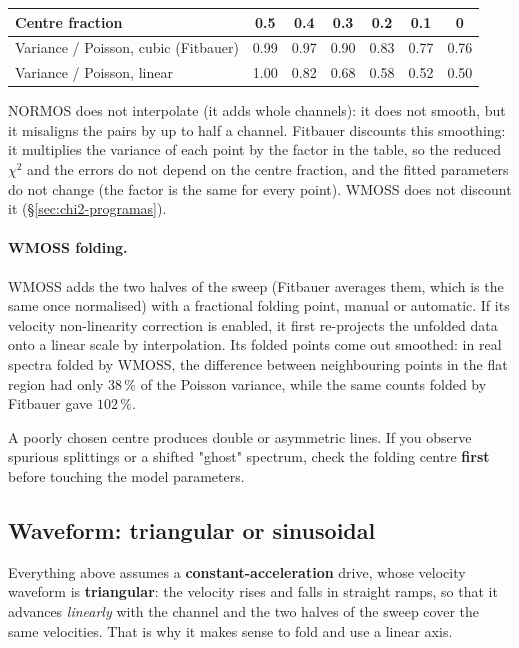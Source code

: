 \begin{center}
\begin{tabular}{@{}lcccccc@{}}
\toprule
Centre fraction & 0.5 & 0.4 & 0.3 & 0.2 & 0.1 & 0 \\
\midrule
Variance / Poisson, cubic (Fitbauer) & 0.99 & 0.97 & 0.90 & 0.83 & 0.77 & 0.76 \\
Variance / Poisson, linear           & 1.00 & 0.82 & 0.68 & 0.58 & 0.52 & 0.50 \\
\bottomrule
\end{tabular}
\end{center}

\noindent NORMOS does not interpolate (it adds whole channels): it does not
smooth, but it misaligns the pairs by up to half a channel. Fitbauer discounts this smoothing: it multiplies the variance of each point by
the factor in the table, so the reduced $\chi^2$ and the errors do not depend on
the centre fraction, and the fitted parameters do not change (the factor is the
same for every point). WMOSS does not discount it (§\ref{sec:chi2-programas}).

\paragraph{WMOSS folding.} WMOSS adds the two halves of the sweep (Fitbauer
averages them, which is the same once normalised) with a fractional folding
point, manual or automatic. If its velocity non-linearity correction is enabled,
it first re-projects the unfolded data onto a linear scale by interpolation. Its
folded points come out smoothed: in real spectra folded by WMOSS, the difference
between neighbouring points in the flat region had only $38\,\%$ of the Poisson
variance, while the same counts folded by Fitbauer gave $102\,\%$.

\begin{aviso}
A poorly chosen centre produces double or asymmetric lines. If you observe
spurious splittings or a shifted "ghost" spectrum, check the folding centre
\textbf{first} before touching the model parameters.
\end{aviso}

\subsection{Waveform: triangular or sinusoidal}
\label{sec:drive-form}

Everything above assumes a \textbf{constant-acceleration} drive, whose velocity
waveform is \textbf{triangular}: the velocity rises and falls in straight ramps,
so that it advances \emph{linearly} with the channel and the two halves of the
sweep cover the same velocities. That is why it makes sense to fold and use a
linear axis.

